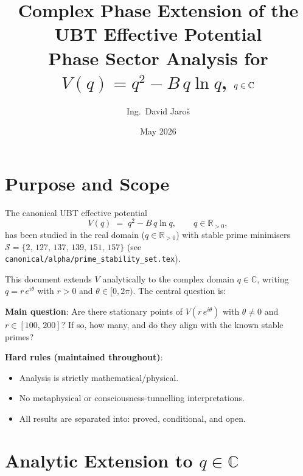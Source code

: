 \documentclass[12pt,a4paper]{article}
\title{\textbf{Complex Phase Extension of the UBT Effective Potential}\\
         \large Phase Sector Analysis for $V(q) = q^2 - B\,q\ln q$, $q \in \CC$}
\author{Ing.\ David Jaro\v{s}}
\date{May 2026}
\theoremstyle{definition}
\theoremstyle{remark}
\newcommand{\CC}{\mathbb{C}}
\newcommand{\RR}{\mathbb{R}}
\begin{document}
  \maketitle
  \tableofcontents
  \newpage
\fi

\section{Purpose and Scope}
\label{sec:cpe:purpose}

The canonical UBT effective potential
\begin{equation}
  V(q) \;=\; q^2 - B\,q\ln q, \qquad q \in \RR_{>0},
  \label{eq:cpe:V_real}
\end{equation}
has been studied in the real domain ($q \in \RR_{>0}$) with stable prime
minimisers $\mathcal{S} = \{2,\,127,\,137,\,139,\,151,\,157\}$
(see \texttt{canonical/alpha/prime\_stability\_set.tex}).

This document extends $V$ analytically to the complex domain $q \in \CC$,
writing $q = r\,e^{i\theta}$ with $r > 0$ and $\theta \in [0, 2\pi)$.
The central question is:

\begin{infobox}
\textbf{Main question}: Are there stationary points of $V(r\,e^{i\theta})$
with $\theta \neq 0$ and $r \in [100,\,200]$?  If so, how many, and do
they align with the known stable primes?
\end{infobox}

\begin{warnbox}
\textbf{Hard rules (maintained throughout)}:
\begin{itemize}
  \item Analysis is strictly mathematical/physical.
  \item No metaphysical or consciousness-tunnelling interpretations.
  \item All results are separated into: proved, conditional, and open.
\end{itemize}
\end{warnbox}

\section{Analytic Extension to $q \in \CC$}
\label{sec:cpe:extension}
\end{document}
